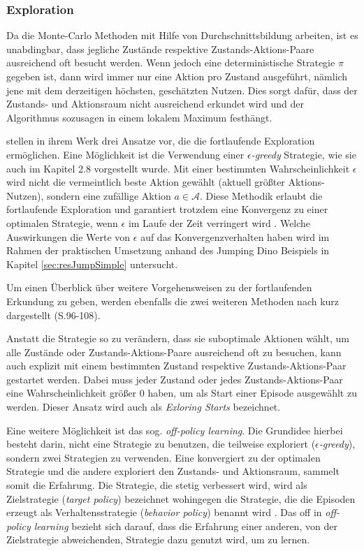 \subsubsection{Exploration}\label{sec:exploration}
Da die Monte-Carlo Methoden mit Hilfe von Durchschnittsbildung arbeiten, ist es unabdingbar, dass jegliche Zustände respektive Zustands-Aktions-Paare ausreichend oft besucht werden. Wenn jedoch eine deterministische Strategie $\pi$ gegeben ist, dann wird immer nur eine Aktion pro Zustand ausgeführt, nämlich jene mit dem derzeitigen höchsten, geschätzten Nutzen. Dies sorgt dafür, dass der Zustands- und Aktionsraum nicht ausreichend erkundet wird und der Algorithmus sozusagen in einem lokalem Maximum festhängt.
\par 
\cite{Sutton1998} stellen in ihrem Werk drei Ansatze vor, die die fortlaufende Exploration ermöglichen. Eine Möglichkeit ist die Verwendung einer $\epsilon$\textit{-greedy} Strategie, wie sie auch im Kapitel 2.8 vorgestellt wurde. Mit einer bestimmten Wahrscheinlichkeit $\epsilon$ wird nicht die vermeintlich beste Aktion gewählt (aktuell größter  Aktions-Nutzen), sondern eine zufällige Aktion $a \in \mathcal{A}$. Diese Methodik erlaubt die fortlaufende Exploration und garantiert trotzdem eine Konvergenz zu einer optimalen Strategie, wenn $\epsilon$ im Laufe der Zeit verringert wird \cite[S.~201]{Sutton1998}. Welche Auswirkungen die Werte von $\epsilon$ auf das Konvergenzverhalten haben wird im Rahmen der praktischen Umsetzung anhand des Jumping Dino Beispiels in Kapitel \ref{sec:resJumpSimple} untersucht.
\par 
Um einen Überblick über weitere Vorgehensweisen zu der fortlaufenden Erkundung zu geben, werden ebenfalls die zwei weiteren Methoden nach \cite{Sutton1998} kurz dargestellt (S.96-108). 
\par 
Anstatt die Strategie so zu verändern, dass sie suboptimale Aktionen wählt, um alle Zustände oder Zustands-Aktions-Paare ausreichend oft zu besuchen, kann auch explizit mit einem bestimmten Zustand respektive Zustands-Aktions-Paar gestartet werden. Dabei muss jeder Zustand oder jedes Zustands-Aktions-Paar eine Wahrscheinlichkeit größer 0 haben, um als Start einer Episode ausgewählt zu werden. Dieser Ansatz wird auch als \textit{Exloring Starts} bezeichnet.
\par
Eine weitere Möglichkeit ist das sog. \textit{off-policy learning}. Die Grundidee hierbei besteht darin, nicht eine Strategie zu benutzen, die teilweise exploriert ($\epsilon$\textit{-greedy}), sondern zwei Strategien zu verwenden. Eine konvergiert zu der optimalen Strategie und die andere exploriert den Zustands- und Aktionsraum, sammelt somit die Erfahrung. Die Strategie, die stetig verbessert wird, wird als Zielstrategie (\textit{target policy}) bezeichnet wohingegen die Strategie, die die Episoden erzeugt als Verhaltensstrategie (\textit{behavior policy}) benannt wird \cite[S.~103]{Sutton1998}. Das \glqq off \grqq{} in \textit{off-policy learning} bezieht sich darauf, dass die Erfahrung einer anderen, von der Zielstrategie abweichenden, Strategie dazu genutzt wird, um zu lernen.
\pagebreak
